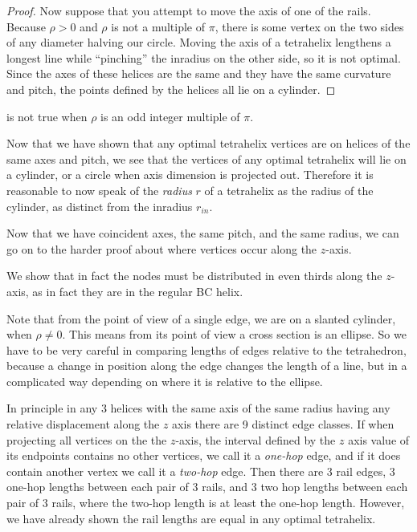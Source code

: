 \documentclass[review]{siamonline1116}
\begin{document}
\begin{proof}
Now suppose that you attempt to move the axis of one of the rails. Because
$\rho > 0 $ and $\rho$ is not a multiple of $\pi$, there is some vertex on the two sides of any diameter
halving our circle. Moving the axis of a tetrahelix lengthens a longest line while ``pinching'' the
inradius on the other side, so it is not optimal. Since the axes of these helices are the
same and they have the same curvature and pitch, the points defined by the helices all lie
on a cylinder.


\end{proof}

 is not true when $\rho$ is an odd integer multiple of $\pi$.

Now that we have shown that any optimal tetrahelix vertices
are on helices of the same axes and pitch, we see that the vertices 
of any optimal tetrahelix will lie on a cylinder, or a circle when axis dimension
is projected out. Therefore it is reasonable to now speak of the \emph{radius} $r$
of a tetrahelix as the radius of the cylinder, as distinct from the inradius $r_{in}$.

Now that we have coincident axes, the same pitch, and the same radius, we can go on to
 the harder proof about where vertices occur along the $z$-axis.

 We show that in fact the nodes must be distributed in even thirds
 along the $z$-axis, as in fact they are in the regular BC helix.

 Note that from the point of view of a single edge, we are on a
 slanted cylinder, when $\rho \neq 0$.  This means from its point of
 view a cross section is an ellipse. So we have to be very careful in
 comparing lengths of edges relative to the tetrahedron, because a
 change in position along the edge changes the length of a line, but
 in a complicated way depending on where it is relative to the
 ellipse.

 In principle in any 3 helices with the same axis of the same radius
 having any relative
 displacement along the $z$ axis there are 9 distinct edge classes.
 If when projecting all vertices on the the $z$-axis, the interval
 defined by the $z$ axis value of its endpoints contains no other vertices,
 we call it a \emph{one-hop} edge, and if it does contain another vertex we
 call it a \emph{two-hop} edge.
 Then there are 
 3 rail edges, 3 one-hop lengths between each pair of 3 rails, and 3 two hop
 lengths between each pair of 3 rails, where the two-hop length is at least
 the one-hop length.
 However, we have already shown the rail
 lengths are equal in any optimal tetrahelix.
\end{document}
